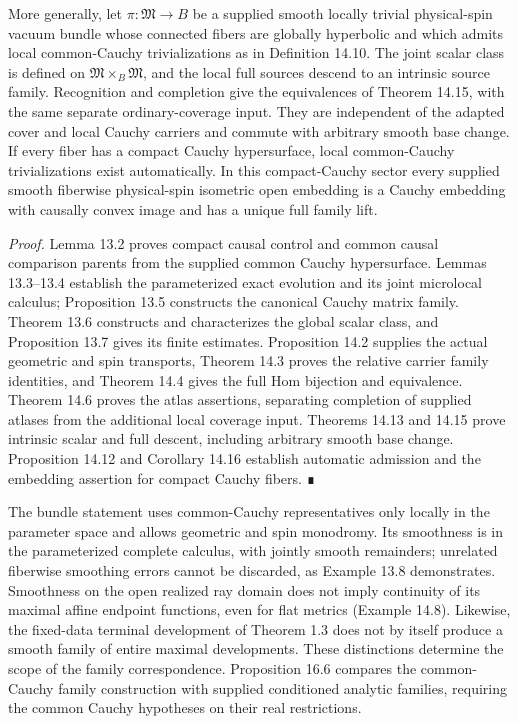 \documentclass[
  english,
  11pt,
  reqno]{amsart}
\begin{document}
More generally, let \(\pi:\mathfrak M\to B\) be a supplied smooth
locally trivial physical-spin vacuum bundle whose connected fibers are
globally hyperbolic and which admits local common-Cauchy trivializations
as in Definition 14.10. The joint scalar class is defined on
\(\mathfrak M\times_B\mathfrak M\), and the local full sources descend
to an intrinsic source family. Recognition and completion give the
equivalences of Theorem 14.15, with the same separate ordinary-coverage
input. They are independent of the adapted cover and local Cauchy
carriers and commute with arbitrary smooth base change. If every fiber
has a compact Cauchy hypersurface, local common-Cauchy trivializations
exist automatically. In this compact-Cauchy sector every supplied smooth
fiberwise physical-spin isometric open embedding is a Cauchy embedding
with causally convex image and has a unique full family lift.

\emph{Proof.} Lemma 13.2 proves compact causal control and common causal
comparison parents from the supplied common Cauchy hypersurface. Lemmas
13.3--13.4 establish the parameterized exact evolution and its joint
microlocal calculus; Proposition 13.5 constructs the canonical Cauchy
matrix family. Theorem 13.6 constructs and characterizes the global
scalar class, and Proposition 13.7 gives its finite estimates.
Proposition 14.2 supplies the actual geometric and spin transports,
Theorem 14.3 proves the relative carrier family identities, and Theorem
14.4 gives the full Hom bijection and equivalence. Theorem 14.6 proves
the atlas assertions, separating completion of supplied atlases from the
additional local coverage input. Theorems 14.13 and 14.15 prove
intrinsic scalar and full descent, including arbitrary smooth base
change. Proposition 14.12 and Corollary 14.16 establish automatic
admission and the embedding assertion for compact Cauchy fibers. ∎

The bundle statement uses common-Cauchy representatives only locally in
the parameter space and allows geometric and spin monodromy. Its
smoothness is in the parameterized complete calculus, with jointly
smooth remainders; unrelated fiberwise smoothing errors cannot be
discarded, as Example 13.8 demonstrates. Smoothness on the open realized
ray domain does not imply continuity of its maximal affine endpoint
functions, even for flat metrics (Example 14.8). Likewise, the
fixed-data terminal development of Theorem 1.3 does not by itself
produce a smooth family of entire maximal developments. These
distinctions determine the scope of the family correspondence.
Proposition 16.6 compares the common-Cauchy family construction with
supplied conditioned analytic families, requiring the common Cauchy
hypotheses on their real restrictions.
\end{document}
